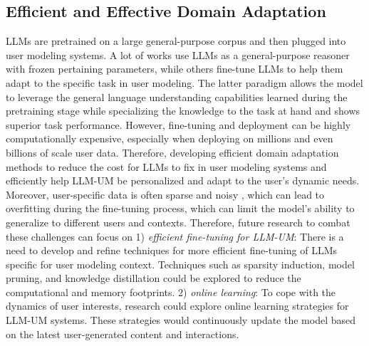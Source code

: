 \documentclass[11pt]{article}
\begin{document}

\subsection{Efficient and Effective Domain Adaptation}
LLMs are pretrained on a large general-purpose corpus and then plugged into user modeling systems. A lot of works use LLMs as a general-purpose reasoner with frozen pertaining parameters, while others fine-tune LLMs to help them adapt to the specific task in user modeling. The latter paradigm allows the model to leverage the general language understanding capabilities learned during the pretraining stage while specializing the knowledge to the task at hand and shows superior task performance. However, fine-tuning and deployment can be highly computationally expensive, especially when deploying on millions and even billions of scale user data. Therefore, developing efficient domain adaptation methods to reduce the cost for LLMs to fix in user modeling systems and efficiently help LLM-UM be personalized and adapt to the user's dynamic needs. Moreover, user-specific data is often sparse and noisy \cite{koren2009matrix, das2018personalized}, which can lead to overfitting during the fine-tuning process, which can limit the model's ability to generalize to different users and contexts. Therefore, future research to combat these challenges can focus on 1) \textit{efficient fine-tuning for LLM-UM}: There is a need to develop and refine techniques for more efficient fine-tuning of LLMs specific for user modeling context. Techniques such as sparsity induction, model pruning, and knowledge distillation could be explored to reduce the computational and memory footprints. 2) \textit{online learning}: To cope with the dynamics of user interests, research could explore online learning strategies for LLM-UM systems. These strategies would continuously update the model based on the latest user-generated content and interactions.
\end{document}
